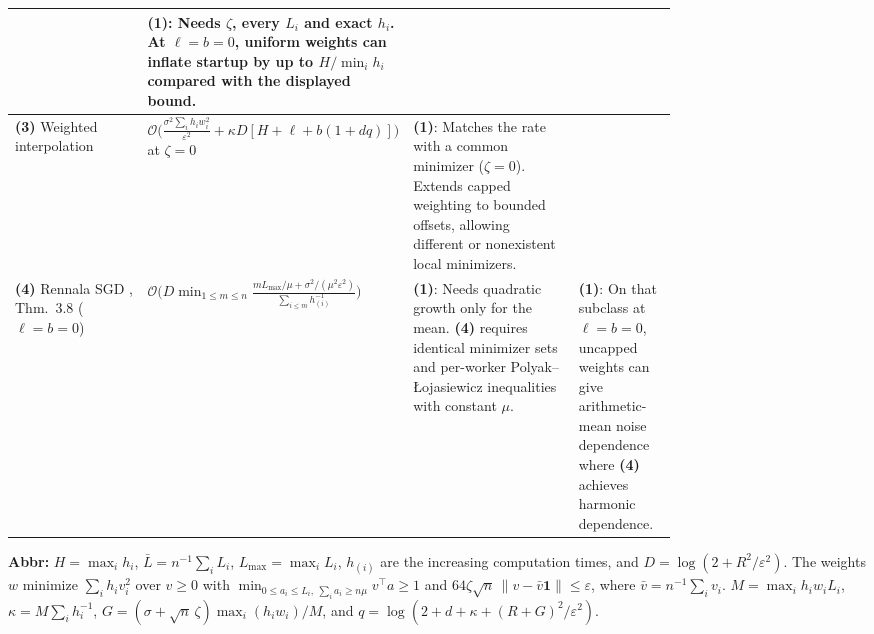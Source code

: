 \begin{table}[tp]
\begin{threeparttable}
\begin{tabularx}{\linewidth}{@{}>{\raggedright\arraybackslash}p{0.20\linewidth}>{\raggedright\arraybackslash}p{0.32\linewidth}>{\raggedright\arraybackslash}p{0.25\linewidth}>{\raggedright\arraybackslash}X@{}}
& \textbf{(1)}: Needs $\zeta$, every $L_i$ and exact $h_i$. At $\ell=b=0$, uniform weights can inflate startup by up to $H/\min_i h_i$ compared with the displayed bound. \\
\midrule
\textbf{(3)} Weighted interpolation \citep{dohWeightedInterpolation2026}
& $\mathcal{O}\bigl(\frac{\sigma^2\sum_i h_i w_i^2}{\varepsilon^2}+\kappa D[H+\ell+b(1+dq)]\bigr)$ at $\zeta=0$
& \textbf{(1)}: Matches the rate with a common minimizer ($\zeta=0$). Extends capped weighting to bounded offsets, allowing different or nonexistent local minimizers.
& \\
\midrule
\textbf{(4)} Rennala SGD \citep{dwiTyurin2026v1}, Thm.~3.8 ($\ell=b=0$)
& $\mathcal{O}\bigl(D\min_{1\le m\le n}\frac{mL_{\max}/\mu+\sigma^2/(\mu^2\varepsilon^2)}{\sum_{i\le m}h_{(i)}^{-1}}\bigr)$
& \textbf{(1)}: Needs quadratic growth only for the mean. \textbf{(4)} requires identical minimizer sets and per-worker Polyak--{\L}ojasiewicz inequalities with constant $\mu$.
& \textbf{(1)}: On that subclass at $\ell=b=0$, uncapped weights can give arithmetic-mean noise dependence where \textbf{(4)} achieves harmonic dependence. \\
\bottomrule
\end{tabularx}
\begin{tablenotes}[flushleft]\footnotesize
\item[] \textbf{Abbr:} $H=\max_i h_i$, $\bar L=n^{-1}\sum_i L_i$, $L_{\max}=\max_i L_i$, $h_{(i)}$ are the increasing computation times, and $D=\log(2+R^2/\varepsilon^2)$. 
The weights $w$ minimize $\sum_i h_i v_i^2$ over $v\ge0$ with
$\min_{0\le a_i\le L_i,\ \sum_i a_i\ge n\mu}v^\top a\ge1$ and
$64\zeta\sqrt{n}\,\|v-\bar v\mathbf 1\|\le\varepsilon$, where $\bar v=n^{-1}\sum_i v_i$.
$M=\max_i h_iw_iL_i$, $\kappa=M\sum_i h_i^{-1}$,
$G=(\sigma+\sqrt n\,\zeta)\max_i(h_iw_i)/M$, and
$q=\log(2+d+\kappa+(R+G)^2/\varepsilon^2)$.
\end{tablenotes}
\end{threeparttable}
\end{table}
